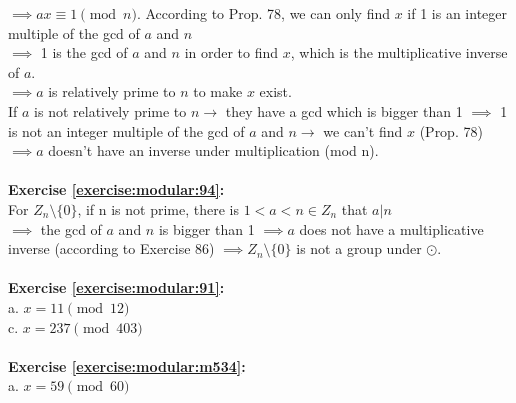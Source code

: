 $\implies ax \equiv 1 \pmod{n}$.
According to Prop. 78, we can only find $x$ if 1 is an integer multiple of the gcd of $a$ and $n$\\
$\implies$  1 is the gcd of $a$ and $n$ in order to find $x$, which is the multiplicative inverse of $a$.\\
$\implies a$ is relatively prime to $n$ to make $x$ exist.\\
If $a$ is not relatively prime to $n \to$ they have a gcd which is bigger than 1 $\implies$  1 is not an integer multiple of the gcd of $a$ and $n \to$ we can't find $x$ (Prop. 78) $\implies a$ doesn't have an inverse under multiplication (mod n).\\
\\
\textbf{Exercise \ref{exercise:modular:94}:}\\
For $Z_n \setminus \{0\}$, if n is not prime, there is $1<a<n \in Z_n$ that $a|n$\\
$\implies$  the gcd of $a$ and $n$ is bigger than 1 $\implies a$ does not have a multiplicative inverse (according to Exercise 86) $\implies Z_n \setminus \{0\}$ is not a group under $\odot$.\\
\\
\textbf{Exercise \ref{exercise:modular:91}:}\\
a. $x=11 \pmod{12}$\\
c. $x=237 \pmod{403}$\\
\\
\textbf{Exercise \ref{exercise:modular:m534}:}\\%
a. $x=59 \pmod{60}$\\
\\
